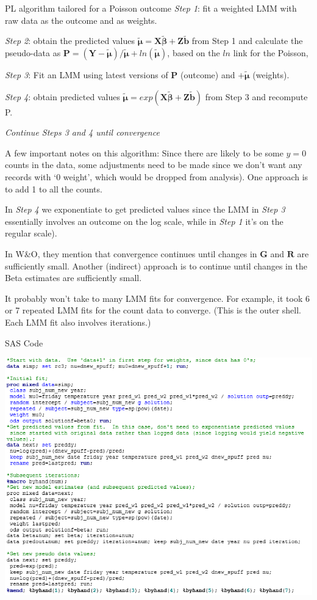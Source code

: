 \documentclass[
  9pt,
  ignorenonframetext,
]{beamer}
\begin{document}
\begin{frame}{PL algorithm tailored for a Poisson outcome}
\protect\hypertarget{pl-algorithm-tailored-for-a-poisson-outcome}{}
\emph{Step 1}: fit a weighted LMM with raw data as the outcome and as
weights.

\emph{Step 2}: obtain the predicted values
\(\pmb {\tilde \mu} =\pmb {X \tilde \beta} + \pmb {Z\tilde b}\) from
Step 1 and calculate the pseudo-data as
\(\pmb P=(\pmb {Y-\tilde \mu})/\pmb {\tilde \mu} + ln(\pmb {\tilde \mu})\),
based on the \(ln\) link for the Poisson,

\emph{Step 3}: Fit an LMM using latest versions of \(\pmb P\) (outcome)
and \(+ \pmb {\tilde \mu}\) (weights).

\emph{Step 4}: obtain predicted values
\(\pmb {\tilde \mu} = exp(\pmb {X \tilde \beta} + \pmb {Z \tilde b})\)
from Step 3 and recompute P.

\emph{Continue Steps 3 and 4 until convergence}
\end{frame}

\begin{frame}{A few important notes on this algorithm:}
\protect\hypertarget{a-few-important-notes-on-this-algorithm}{}
Since there are likely to be some \(y=0\) counts in the data, some
adjustments need to be made since we don't want any records with `0
weight', which would be dropped from analysis). One approach is to add 1
to all the counts.

In \emph{Step 4} we exponentiate to get predicted values since the LMM
in \emph{Step 3} essentially involves an outcome on the log scale, while
in \emph{Step 1} it's on the regular scale).

In W\&O, they mention that convergence continues until changes in
\(\pmb G\) and \(\pmb R\) are sufficiently small. Another (indirect)
approach is to continue until changes in the Beta estimates are
sufficiently small.

It probably won't take to many LMM fits for convergence. For example, it
took 6 or 7 repeated LMM fits for the count data to converge. (This is
the outer shell. Each LMM fit also involves iterations.)
\end{frame}

\begin{frame}{SAS Code}
\protect\hypertarget{sas-code}{}
\begin{center}\includegraphics[width=0.7\linewidth]{figs_L16/f1} \end{center}
\end{frame}
\end{document}
